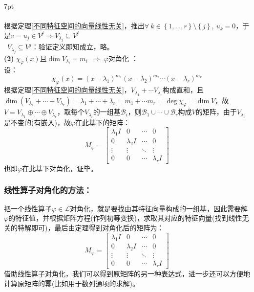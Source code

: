 \documentclass[zihao=5,UTF8]{report}
\theoremstyle{mystyle} %
\newenvironment{graybox}{%
\def\FrameCommand{%
\hspace{1pt}%
{\color{gray}\small \vrule width 2pt}%
{\color{graybox_color}\vrule width 4pt}%
\colorbox{graybox_color}%
}%
\MakeFramed{\advance\hsize-\width\FrameRestore}%
\noindent\hspace{-4.55pt}%
\begin{adjustwidth}{}{7pt}%
\vspace{2pt}\vspace{2pt}%
}
{%
\vspace{2pt}\end{adjustwidth}\endMakeFramed%
}
\begin{document}
\begin{graybox}
\begin{gather*}
\end{gather*}
根据定理\ref{不同特征空间的向量线性无关}，推出$\forall\ k \in \left\{1,...,r\right\} \setminus \left\{j\right\},\ u_k = 0 $，于是$v = u_j \in V^j \Longrightarrow V_{\lambda_j } \subseteq V^j$\\
\ $V_{\lambda_j} \subseteq V^j$：验证定义即知成立，略。\\
\textbf{(2)} $ \chi_{\varphi}(x)$且$\dim V_{\lambda_i} = m_i$\ $\Longrightarrow$ $\varphi$对角化 ：\\
设：
\begin{equation*}
    \chi_{\varphi}(x) = (x-\lambda_1)^{m_1}(x-\lambda_2)^{m_2} \cdots (x-\lambda_r)^{m_r}
\end{equation*}
根据定理\ref{不同特征空间的向量线性无关}，$V_{\lambda_1} + \cdots V_{\lambda_r}$构成直和，且$\dim \left( V_{\lambda_1} + \cdots+ V_{\lambda_r}\right)  = \lambda_1 + \cdots + \lambda_r = m_1 + \cdots m_r = \deg \chi_\varphi = \dim V$，故$V = V_{\lambda_1} \oplus \cdots \oplus V_{\lambda_r}$，取每个$V_{\lambda_i}$的一组基$\mathcal{B}_i$，则$\mathcal{B}_1 \cup \cdots \cup \mathcal{B}_r $构成$V$的矩阵，由于$V_{\lambda_i}$是不变的(有嵌入)，故$\varphi$在此基下的矩阵：
\begin{equation*}
    M_{\varphi} = \begin{bmatrix}  
        \lambda_1I& 0& \cdots  &  0 \\  
        0& \lambda_2I& \cdots  &  0 \\  
        \vdots & \vdots & \ddots & \vdots \\  
        0& 0& \cdots  & \lambda_rI  
      \end{bmatrix}        
\end{equation*}
也即$\varphi$在此基下对角化，证毕。
\end{graybox}

\subsubsection{线性算子对角化的方法：}
把一个线性算子$\varphi \in \mathscr{L}$对角化，就是要找由其特征向量构成的一组基，因此需要解$\varphi$的特征值，并根据矩阵方程(作列初等变换)，求取其对应的特征向量(找到线性无关的特解即可)，最后由定理得到对角化后的矩阵为：
\begin{equation*}
    M_{\varphi} = \begin{bmatrix}  
        \lambda_1I& 0& \cdots  &  0 \\  
        0& \lambda_2I& \cdots  &  0 \\  
        \vdots & \vdots & \ddots & \vdots \\  
        0& 0& \cdots  & \lambda_rI  
      \end{bmatrix}       
\end{equation*}
{\color{gray}\small 借助线性算子对角化，我们可以得到原矩阵的另一种表达式，进一步还可以方便地计算原矩阵的幂(比如用于数列通项的求解)。}
\end{document}
